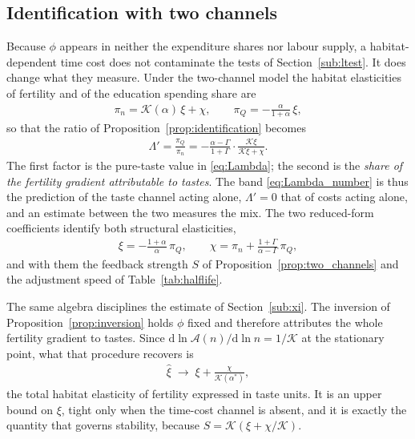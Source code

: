 \documentclass[11pt]{article}
\begin{document}
\subsection{Identification with two channels}
\label{sub:id_two}
Because $\phi$ appears in neither the expenditure shares nor labour supply, a habitat-dependent
time cost does not contaminate the tests of Section~\ref{sub:ltest}. It does change what they
measure. Under the two-channel model the habitat elasticities of fertility and of the education
spending share are
\begin{align}
\pi_n=\mathcal{K}(\alpha)\,\xi+\chi,
\qquad
\pi_Q=-\frac{\alpha}{1+\alpha}\,\xi,
\label{eq:two_elasticities}
\end{align}
so that the ratio of Proposition~\ref{prop:identification} becomes
\begin{align}
\Lambda'=\frac{\pi_Q}{\pi_n}
=-\frac{\alpha-\Gamma}{1+\Gamma}\cdot\frac{\mathcal{K}\xi}{\mathcal{K}\xi+\chi} .
\label{eq:Lambda_share}
\end{align}
The first factor is the pure-taste value in \eqref{eq:Lambda}; the second is the \emph{share of the
fertility gradient attributable to tastes}. The band \eqref{eq:Lambda_number} is thus the
prediction of the taste channel acting alone, $\Lambda'=0$ that of costs acting alone, and an
estimate between the two measures the mix. The two reduced-form coefficients identify both
structural elasticities,
\begin{align}
\xi=-\frac{1+\alpha}{\alpha}\,\pi_Q,
\qquad
\chi=\pi_n+\frac{1+\Gamma}{\alpha-\Gamma}\,\pi_Q,
\label{eq:decomposition}
\end{align}
and with them the feedback strength $S$ of Proposition~\ref{prop:two_channels} and the adjustment
speed of Table~\ref{tab:halflife}.

The same algebra disciplines the estimate of Section~\ref{sub:xi}. The inversion of
Proposition~\ref{prop:inversion} holds $\phi$ fixed and therefore attributes the whole fertility
gradient to tastes. Since $\mathrm{d}\ln\mathcal{A}(n)/\mathrm{d}\ln n=1/\mathcal{K}$ at the
stationary point, what that procedure recovers is
\begin{align}
\hat\xi\;\longrightarrow\;\xi+\frac{\chi}{\mathcal{K}(\alpha^{\ast})},
\label{eq:xi_bound}
\end{align}
the total habitat elasticity of fertility expressed in taste units. It is an upper bound on $\xi$,
tight only when the time-cost channel is absent, and it is exactly the quantity that governs
stability, because $S=\mathcal{K}\left(\xi+\chi/\mathcal{K}\right)$.
\end{document}
